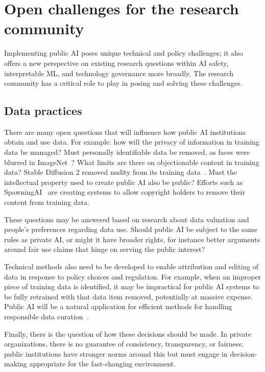 \documentclass{article}
\begin{document}
\section{Open challenges for the research community}
Implementing public AI poses unique technical and policy challenges; it also offers a new perspective on existing research questions within AI safety, interpretable ML, and technology governance more broadly. The research community has a critical role to play in posing and solving these challenges.

\subsection{Data practices}
There are many open questions that will influence how public AI institutions obtain and use data. For example: how will the privacy of information in training data be managed? Must personally identifiable data be removed, as faces were blurred in ImageNet~\cite{yang2022faceobfuscation}? What limits are there on objectionable content in training data?
Stable Diffusion 2 removed nudity from its training data~\cite{rombach2022sd20}. Must the intellectual property used to create public AI also be public? Efforts such as SpawningAI~\cite{spawningai} are creating systems to allow copyright holders to remove their content from training data. 

These questions may be answered based on research about data valuation and people's preferences regarding data use. Should public AI be subject to the same rules as private AI, or might it have broader rights, for instance better arguments around fair use claims that hinge on serving the public interest?

Technical methods also need to be developed to enable attribution and editing of data in response to policy choices and regulation. For example, when an improper piece of training data is identified, it may be impractical for public AI systems to be fully retrained with that data item removed, potentially at massive expense. Public AI will be a natural application for efficient methods for handling responsible data curation~\citep{meng2022locating,meng2022mass,hartvigsen2022aging,gandikota2023unified}.

Finally, there is the question of how these decisions should be made. In private organizations, there is no guarantee of consistency, transparency, or fairness; public institutions have stronger norms around this but must engage in decision-making appropriate for the fast-changing environment.
\end{document}
